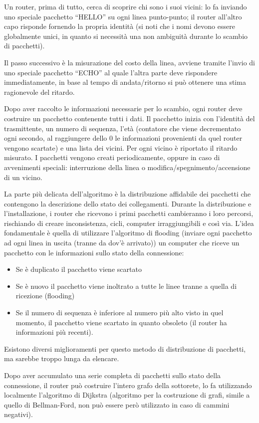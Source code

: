 Un router, prima di tutto, cerca di scoprire chi sono i suoi vicini: lo fa inviando uno speciale pacchetto “HELLO” su ogni linea punto-punto; il router all'altro capo risponde fornendo la propria identità (si noti che i nomi devono essere globalmente unici, in quanto si necessità una non ambiguità durante lo scambio di pacchetti).

Il passo successivo è la misurazione del costo della linea, avviene tramite l'invio di uno speciale pacchetto “ECHO” al quale l'altra parte deve rispondere immediatamente, in base al tempo di andata/ritorno si può ottenere una stima ragionevole del ritardo.

Dopo aver raccolto le informazioni necessarie per lo scambio, ogni router deve costruire un pacchetto contenente tutti i dati. Il pacchetto inizia con l'identità del trasmittente, un numero di sequenza, l'età (contatore che viene decrementato ogni secondo, al raggiungere dello 0 le informazioni provenienti da quel router vengono scartate) e una lista dei vicini. Per ogni vicino è riportato il ritardo misurato. I pacchetti vengono creati periodicamente, oppure in caso di avvenimenti speciali: interruzione della linea o modifica/spegnimento/accensione di un vicino.

La parte più delicata dell'algoritmo è la distribuzione affidabile dei pacchetti che contengono la descrizione dello stato dei collegamenti. Durante la distribuzione e l'installazione, i router che ricevono i primi pacchetti cambieranno i loro percorsi, rischiando di creare inconsistenza, cicli, computer irraggiungibili e così via. L'idea fondamentale è quella di utilizzare l'algoritmo di flooding (inviare ogni pacchetto ad ogni linea in uscita (tranne da dov'è arrivato)) un computer che riceve un pacchetto con le informazioni sullo stato della connessione:
\begin{itemize}
\item	Se è duplicato il pacchetto viene scartato
\item	Se è nuovo il pacchetto viene inoltrato a tutte le linee tranne a quella di ricezione (flooding)
\item	Se il numero di sequenza è inferiore al numero più alto visto in quel momento, il pacchetto viene scartato in quanto obsoleto (il router ha informazioni più recenti).
\end{itemize}
Esistono diversi miglioramenti per questo metodo di distribuzione di pacchetti, ma sarebbe troppo lunga da elencare.

Dopo aver accumulato una serie completa di pacchetti sullo stato della connessione, il router può costruire l'intero grafo della sottorete, lo fa utilizzando localmente l'algoritmo di Dijkstra (algoritmo per la costruzione di grafi, simile a quello di Bellman-Ford, non può essere però utilizzato in caso di cammini negativi).

